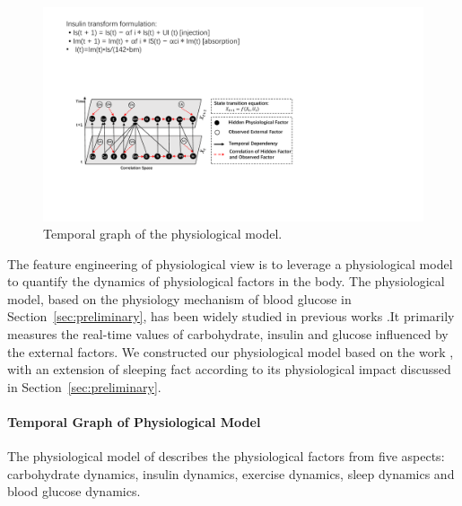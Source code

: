 \begin{figure}[t]
  \centering
  \includegraphics[width=0.9\columnwidth]{./img/Physiological_correlation1.pdf}
  \caption{Temporal graph of the physiological model.}
  \label{fig:phymodel}
\end{figure}
The feature engineering of physiological view is to leverage a physiological model to quantify the dynamics of physiological factors in the body. The
physiological model, based on the physiology mechanism of blood glucose in Section~\ref{sec:preliminary}, has been widely studied in previous works \cite{bib:briegel2002nonlinear,bib:duke2010intelligent, bib:plis2014machine}.It primarily measures the real-time values of carbohydrate, insulin and glucose influenced by the external factors. We constructed our physiological model based on the work \cite{bib:duke2010intelligent},
with an extension of sleeping fact according to its physiological impact discussed in Section~\ref{sec:preliminary}.

\paragraph{Temporal Graph of Physiological Model}
The physiological model of \sysname describes the physiological factors from five aspects: carbohydrate dynamics, insulin dynamics, exercise dynamics,
sleep dynamics and blood glucose dynamics.

